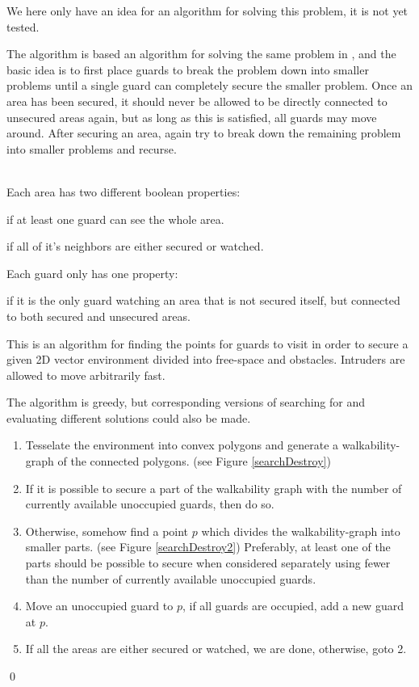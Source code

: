 We here only have an idea for an algorithm for solving this problem, it is not yet tested.

The algorithm is based an algorithm for solving the same problem in \cite{multiSearchSecure}, and the basic idea is to first place guards to break the problem down into smaller problems until a single guard can completely secure the smaller problem.
Once an area has been secured, it should never be allowed to be directly connected to unsecured areas again, but as long as this is satisfied, all guards may move around.
After securing an area, again try to break down the remaining problem into smaller problems and recurse.

\ \\
Each area has two different boolean properties:
\begin{definition}[Watched]
if at least one guard can see the whole area.
\end{definition}
\begin{definition}[Secured]
if all of it's neighbors are either secured or watched.
\end{definition}

Each guard only has one property:
\begin{definition}[Occupied]
if it is the only guard watching an area that is not secured itself, but connected to both secured and unsecured areas.
\end{definition}

\begin{algorithm}
This is an algorithm for finding the points for guards to visit in order to secure a given 2D vector environment divided into free-space and obstacles. Intruders are allowed to move arbitrarily fast.

The algorithm is greedy, but corresponding versions of searching for and evaluating different solutions could also be made.
\begin{enumerate}[topsep=1pt,itemsep=0ex,partopsep=1ex,parsep=1ex]
	\item Tesselate the environment into convex polygons and generate a walkability-graph of the connected polygons. (see Figure \ref{searchDestroy})
	\item If it is possible to secure a part of the walkability graph with the number of currently available unoccupied guards, then do so.
	\item Otherwise, somehow find a point $p$ which divides the walkability-graph into smaller parts. (see Figure \ref{searchDestroy2})
			Preferably, at least one of the parts should be possible to secure when considered separately using fewer than the number of currently available unoccupied guards.
	\item Move an unoccupied guard to $p$, if all guards are occupied, add a new guard at $p$.
	\item If all the areas are either secured or watched, we are done, otherwise, goto 2.
\end{enumerate}
\qed
\label{algSearchDestroyIdea}
\end{algorithm}

